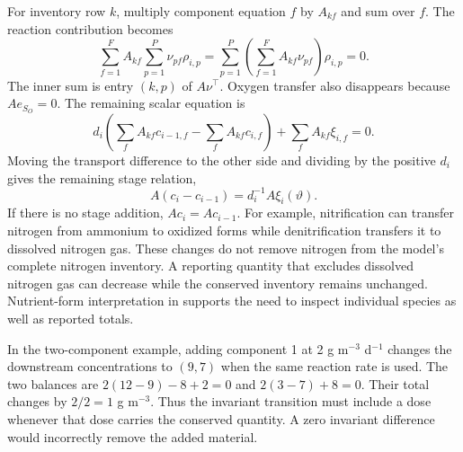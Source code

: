 For inventory row $k$, multiply component equation $f$ by $A_{kf}$ and sum over $f$. The reaction contribution becomes
\begin{equation}
\sum_{f=1}^{F}A_{kf}\sum_{p=1}^{P}\nu_{pf}\rho_{i,p}
=\sum_{p=1}^{P}\left(\sum_{f=1}^{F}A_{kf}\nu_{pf}\right)\rho_{i,p}=0.
\end{equation}
The inner sum is entry $(k,p)$ of $A\nu^\top$. Oxygen transfer also disappears because $Ae_{S_O}=0$. The remaining scalar equation is
\begin{equation}
d_i\left(\sum_fA_{kf}c_{i-1,f}-\sum_fA_{kf}c_{i,f}\right)
+\sum_fA_{kf}\xi_{i,f}=0.
\end{equation}
Moving the transport difference to the other side and dividing by the positive $d_i$ gives the remaining stage relation,
\begin{equation}
A(c_i-c_{i-1})=d_i^{-1}A\xi_i(\vartheta).
\label{eq:plant_invariant_transition}
\end{equation}
If there is no stage addition, $Ac_i=Ac_{i-1}$. For example, nitrification can transfer nitrogen from ammonium to oxidized forms while denitrification transfers it to dissolved nitrogen gas. These changes do not remove nitrogen from the model's complete nitrogen inventory. A reporting quantity that excludes dissolved nitrogen gas can decrease while the conserved inventory remains unchanged. Nutrient-form interpretation in \citet{USEPA2009} supports the need to inspect individual species as well as reported totals.

In the two-component example, adding component 1 at 2 g m$^{-3}$ d$^{-1}$ changes the downstream concentrations to $(9,7)$ when the same reaction rate is used. The two balances are $2(12-9)-8+2=0$ and $2(3-7)+8=0$. Their total changes by $2/2=1$ g m$^{-3}$. Thus the invariant transition must include a dose whenever that dose carries the conserved quantity. A zero invariant difference would incorrectly remove the added material.

